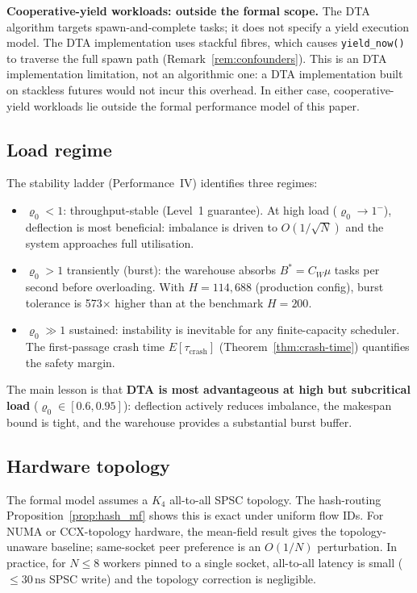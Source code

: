 \documentclass[11pt,a4paper]{article}
\newcommand{\dtact}{\textsc{DTA}}
\begin{document}
\medskip
\noindent\textbf{Cooperative-yield workloads: outside the formal scope.}
The DTA algorithm targets spawn-and-complete tasks; it does not specify
a yield execution model.  The \dtact{} implementation uses stackful fibres,
which causes \texttt{yield\_now()} to traverse the full spawn path
(Remark~\ref{rem:confounders}).  This is an \dtact{} implementation
limitation, not an algorithmic one: a DTA implementation built on stackless
futures would not incur this overhead.  In either case, cooperative-yield
workloads lie outside the formal performance model of this paper.

\subsection{Load regime}

The stability ladder (Performance~IV) identifies three regimes:
\begin{itemize}
  \item $\varrho_0 < 1$: throughput-stable (Level~1 guarantee).
        At high load ($\varrho_0 \to 1^-$), deflection is most
        beneficial: imbalance is driven to $O(1/\sqrt{N})$ and the
        system approaches full utilisation.
  \item $\varrho_0 > 1$ transiently (burst): the warehouse absorbs
        $B^* = C_W \mu$ tasks per second before overloading.
        With $H = 114{,}688$ (production config), burst tolerance
        is 573$\times$ higher than at the benchmark $H=200$.
  \item $\varrho_0 \gg 1$ sustained: instability is inevitable for
        any finite-capacity scheduler.  The first-passage crash time
        $E[\tau_{\mathrm{crash}}]$ (Theorem~\ref{thm:crash-time})
        quantifies the safety margin.
\end{itemize}
The main lesson is that \textbf{DTA is most advantageous at high but
subcritical load} ($\varrho_0 \in [0.6, 0.95]$): deflection actively
reduces imbalance, the makespan bound is tight, and the warehouse
provides a substantial burst buffer.

\subsection{Hardware topology}

The formal model assumes a $K_4$ all-to-all SPSC topology.
The hash-routing Proposition~\ref{prop:hash_mf} shows this is exact
under uniform flow IDs.  For NUMA or CCX-topology hardware, the
mean-field result gives the topology-unaware baseline; same-socket
peer preference is an $O(1/N)$ perturbation.  In practice, for
$N \leq 8$ workers pinned to a single socket, all-to-all latency is
small ($\leq 30\,\mathrm{ns}$ SPSC write) and the topology correction
is negligible.
\end{document}
